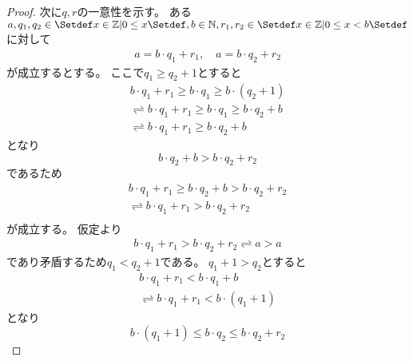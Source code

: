 \documentclass[uplatex, 11pt, a4j, dvipdfmx]{jsarticle}
\begin{document}
\begin{proof}
      次に$q, r$の一意性を示す。
      ある$a, q_1, q_2 \in \Set{ x \in \Z | 0 \leq x }, b \in \N, r_1, r_2 \in \Set{ x \in \Z | 0 \leq x < b }$に対して
      \begin{equation}\begin{gathered}
        a = b \cdot q_1 + r_1, \quad a = b \cdot q_2 + r_2
      \end{gathered}\end{equation}
      が成立するとする。
      ここで$q_1 \geq q_2 + 1$とすると
      \begin{equation} \begin{aligned}
        b \cdot q_1 + r_1 \geq b \cdot q_1 \geq b \cdot (q_2 + 1) \\
        \rightleftharpoons b \cdot q_1 + r_1 \geq b \cdot q_1 \geq b \cdot q_2 + b \\
        \rightleftharpoons b \cdot q_1 + r_1 \geq b \cdot q_2 + b
      \end{aligned} \end{equation}
      となり
      \begin{equation}
        b \cdot q_2 + b > b \cdot q_2 + r_2
      \end{equation}
      であるため
      \begin{equation} \begin{aligned}
        b \cdot q_1 + r_1 \geq b \cdot q_2 + b > b \cdot q_2 + r_2 \\
        \rightleftharpoons b \cdot q_1 + r_1 > b \cdot q_2 + r_2 \\
      \end{aligned} \end{equation}
      が成立する。
      仮定より
      \begin{equation} \begin{aligned}
        b \cdot q_1 + r_1 > b \cdot q_2 + r_2 \rightleftharpoons a > a
      \end{aligned} \end{equation}
      であり矛盾するため$q_1 < q_2 + 1$である。
      $q_1 + 1 > q_2$とすると
      \begin{equation} \begin{aligned}
        b \cdot q_1 + r_1 < b \cdot q_1 + b \\
        \rightleftharpoons b \cdot q_1 + r_1 < b \cdot (q_1 + 1)
      \end{aligned} \end{equation}
      となり
      \begin{equation}
        b \cdot (q_1 + 1) \leq b \cdot q_2 \leq b \cdot q_2 + r_2

\end{equation}
\end{proof}
\end{document}
